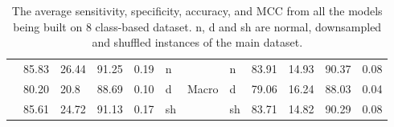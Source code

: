 \begin{table}[ht]
\begin{tabular}{|L |V V V V g g g V V V V |}

        & 85.83 & 26.44 & 91.25 & 0.19 &    n&&n                & 83.91 & 14.93 & 90.37 & 0.08\\
        & 80.20 & 20.8 & 88.69 & 0.10 &     d&\small{Macro}&d   & 79.06 & 16.24 & 88.03 &  0.04\\
        & 85.61 & 24.72 & 91.13 & 0.17 &    sh&&sh              & 83.71 & 14.82 & 90.29 & 0.08 \\
        
        \hline
        
       

    \end{tabular}
    \captionsetup{font=small,width=12cm}
    \caption{The average sensitivity, specificity, accuracy, and MCC from all the 
    models being built on 8 class-based dataset. n, d and sh are normal, 
    downsampled and shuffled instances of the main dataset.}
    \label{tab:table5}
    
\end{table}


